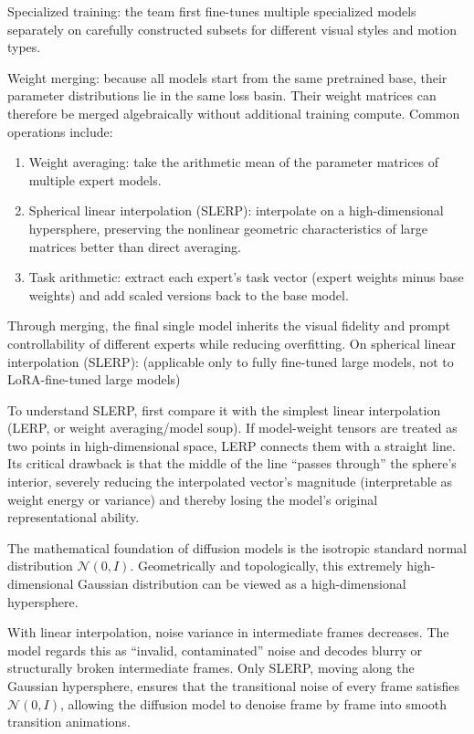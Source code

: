 Specialized training: the team first fine-tunes multiple specialized models separately on carefully constructed subsets for different visual styles and motion types.

Weight merging: because all models start from the same pretrained base, their parameter distributions lie in the same loss basin. Their weight matrices can therefore be merged algebraically without additional training compute. Common operations include:

\begin{enumerate}
\def\labelenumi{\arabic{enumi}.}
\item
  Weight averaging: take the arithmetic mean of the parameter matrices of multiple expert models.
\item
  Spherical linear interpolation (SLERP): interpolate on a high-dimensional hypersphere, preserving the nonlinear geometric characteristics of large matrices better than direct averaging.
\item
  Task arithmetic: extract each expert's task vector (expert weights minus base weights) and add scaled versions back to the base model.
\end{enumerate}

Through merging, the final single model inherits the visual fidelity and prompt controllability of different experts while reducing overfitting.
On spherical linear interpolation (SLERP): (applicable only to fully fine-tuned large models, not to LoRA-fine-tuned large models)

To understand SLERP, first compare it with the simplest linear interpolation (LERP, or weight averaging/model soup). If model-weight tensors are treated as two points in high-dimensional space, LERP connects them with a straight line. Its critical drawback is that the middle of the line ``passes through'' the sphere's interior, severely reducing the interpolated vector's magnitude (interpretable as weight energy or variance) and thereby losing the model's original representational ability.

The mathematical foundation of diffusion models is the isotropic standard normal distribution \(\mathcal{N}(0,I)\). Geometrically and topologically, this extremely high-dimensional Gaussian distribution can be viewed as a high-dimensional hypersphere.

With linear interpolation, noise variance in intermediate frames decreases. The model regards this as ``invalid, contaminated'' noise and decodes blurry or structurally broken intermediate frames. Only SLERP, moving along the Gaussian hypersphere, ensures that the transitional noise of every frame satisfies \(\mathcal{N}(0,I)\), allowing the diffusion model to denoise frame by frame into smooth transition animations.

